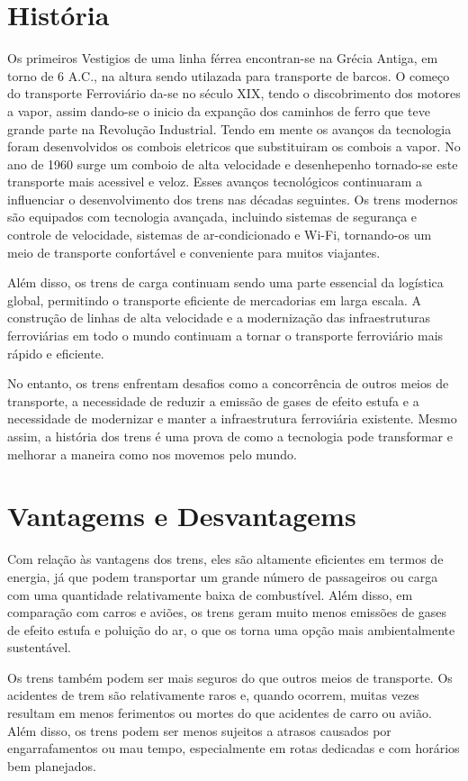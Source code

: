 \documentclass{report}
\begin{document}
\section{Hist\'oria}
Os primeiros Vestigios de uma linha f\'errea encontran-se na Gr\'ecia Antiga, em torno de 6 A.C., na altura sendo utilazada para transporte de barcos.
O come\c co do transporte Ferroviário da-se no s\' eculo XIX, tendo o discobrimento dos motores a vapor, assim dando-se o inicio da expan\c c\~ ao dos caminhos de ferro que teve grande parte na Revolu\c c\~ao Industrial. Tendo em mente os avan\c cos da tecnologia foram desenvolvidos os combois eletricos que substituiram os combois a vapor. No ano de 1960 surge um comboio de alta velocidade e desenhepenho tornado-se este transporte mais acessivel e veloz.
Esses avanços tecnológicos continuaram a influenciar o desenvolvimento dos trens nas décadas seguintes. Os trens modernos são equipados com tecnologia avançada, incluindo sistemas de segurança e controle de velocidade, sistemas de ar-condicionado e Wi-Fi, tornando-os um meio de transporte confortável e conveniente para muitos viajantes.

Além disso, os trens de carga continuam sendo uma parte essencial da logística global, permitindo o transporte eficiente de mercadorias em larga escala. A construção de linhas de alta velocidade e a modernização das infraestruturas ferroviárias em todo o mundo continuam a tornar o transporte ferroviário mais rápido e eficiente.

No entanto, os trens enfrentam desafios como a concorrência de outros meios de transporte, a necessidade de reduzir a emissão de gases de efeito estufa e a necessidade de modernizar e manter a infraestrutura ferroviária existente. Mesmo assim, a história dos trens é uma prova de como a tecnologia pode transformar e melhorar a maneira como nos movemos pelo mundo.
\newpage
\section{Vantagems e Desvantagems}
Com relação às vantagens dos trens, eles são altamente eficientes em termos de energia, já que podem transportar um grande número de passageiros ou carga com uma quantidade relativamente baixa de combustível. Além disso, em comparação com carros e aviões, os trens geram muito menos emissões de gases de efeito estufa e poluição do ar, o que os torna uma opção mais ambientalmente sustentável.

Os trens também podem ser mais seguros do que outros meios de transporte. Os acidentes de trem são relativamente raros e, quando ocorrem, muitas vezes resultam em menos ferimentos ou mortes do que acidentes de carro ou avião. Além disso, os trens podem ser menos sujeitos a atrasos causados por engarrafamentos ou mau tempo, especialmente em rotas dedicadas e com horários bem planejados.
\end{document}
